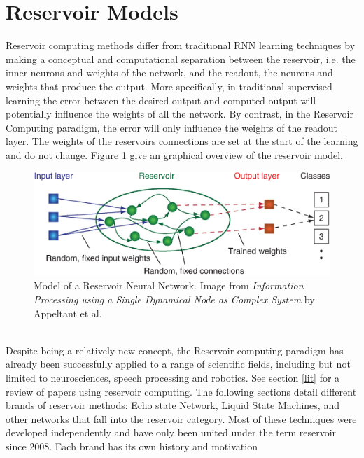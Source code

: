 \documentclass[12pt,oneside]{CUNY_CS_PhD}
\begin{document}
\section{Reservoir Models}
Reservoir computing methods differ from traditional RNN learning techniques by making a conceptual  and computational separation between the reservoir, i.e. the inner neurons and weights of the network, and the readout, the neurons and weights that produce the output. More specifically, in traditional supervised learning the error between the desired output and computed output will potentially influence the weights of all the network. By contrast, in the Reservoir Computing paradigm, the error will only influence the weights of the readout layer. The weights of the 
 reservoirs connections are set at the start of the learning and do not change. Figure \ref{fig:reservoir} give an graphical overview of the reservoir model.
\begin{figure}[h]
\centering
\includegraphics[width=1.0\textwidth]{pictures/reservoir_network.png}
\caption{Model of a Reservoir Neural Network. Image from \textit{Information Processing using a Single Dynamical Node as Complex System} by Appeltant et al. \cite{appeltant2011information} }
\label{fig:reservoir}
\end{figure}\\
Despite being a relatively new concept, the Reservoir computing paradigm has already been successfully applied to a range of scientific fields, including but not limited to neurosciences, speech processing and robotics. See section \ref{lit} for a review of papers using reservoir computing. The following sections detail different brands of reservoir methods: Echo state Network, Liquid State Machines, and other networks that fall into the reservoir category. Most of these techniques were developed independently and have only been united under the term reservoir since 2008. Each brand has its own history and motivation

\end{document}
